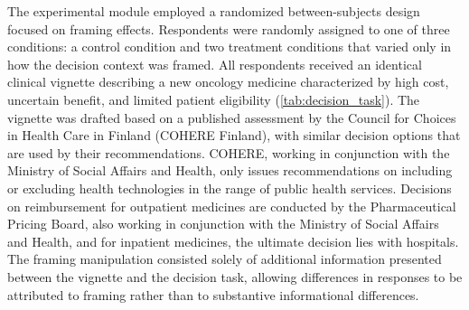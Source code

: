 \documentclass[11pt]{article}\usepackage[]{graphicx}\usepackage[]{xcolor}
\begin{document}
The experimental module employed a randomized between-subjects design focused on framing effects. Respondents were randomly assigned to one of three conditions: a control condition and two treatment conditions that varied only in how the decision context was framed. All respondents received an identical clinical vignette describing a new oncology medicine characterized by high cost, uncertain benefit, and limited patient eligibility (\autoref{tab:decision_task}). The vignette was drafted based on a published assessment by the Council for Choices in Health Care in Finland (COHERE Finland), with similar decision options that are used by their recommendations. COHERE, working in conjunction with the Ministry of Social Affairs and Health, only issues recommendations on including or excluding health technologies in the range of public health services. Decisions on reimbursement for outpatient medicines are conducted by the Pharmaceutical Pricing Board, also working in conjunction with the Ministry of Social Affairs and Health, and for inpatient medicines, the ultimate decision lies with hospitals. The framing manipulation consisted solely of additional information presented between the vignette and the decision task, allowing differences in responses to be attributed to framing rather than to substantive informational differences.
\end{document}
